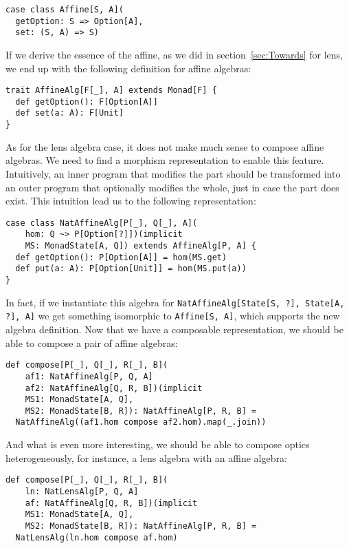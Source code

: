 \documentclass[final, twocolumn, 3p]{elsarticle}
\begin{document}
\begin{lstlisting}
case class Affine[S, A](
  getOption: S => Option[A],
  set: (S, A) => S)
\end{lstlisting}

If we derive the essence of the affine, as we did in section~\ref{sec:Towards}
for lens, we end up with the following definition for affine algebras:

\begin{lstlisting}
trait AffineAlg[F[_], A] extends Monad[F] {
  def getOption(): F[Option[A]]
  def set(a: A): F[Unit]
}
\end{lstlisting}

As for the lens algebra case, it does not make much sense to compose affine
algebras. We need to find a morphism representation to enable this feature.
Intuitively, an inner program that modifies the part should be transformed into
an outer program that optionally modifies the whole, just in case the part does
exist. This intuition lead us to the following representation:

\begin{lstlisting}
case class NatAffineAlg[P[_], Q[_], A](
    hom: Q ~> P[Option[?]])(implicit
    MS: MonadState[A, Q]) extends AffineAlg[P, A] {
  def getOption(): P[Option[A]] = hom(MS.get)
  def put(a: A): P[Option[Unit]] = hom(MS.put(a))
}
\end{lstlisting}

In fact, if we instantiate this algebra for
\lstinline{NatAffineAlg[State[S, ?], State[A, ?], A]} we get something
isomorphic to \lstinline{Affine[S, A]}, which supports the new algebra
definition. Now that we have a composable representation, we should be able to
compose a pair of affine algebras:

\begin{lstlisting}
def compose[P[_], Q[_], R[_], B](
    af1: NatAffineAlg[P, Q, A]
    af2: NatAffineAlg[Q, R, B])(implicit
    MS1: MonadState[A, Q],
    MS2: MonadState[B, R]): NatAffineAlg[P, R, B] =
  NatAffineAlg((af1.hom compose af2.hom).map(_.join))
\end{lstlisting}

And what is even more interesting, we should be able to compose optics
heterogeneously, for instance, a lens algebra with an affine algebra:

\begin{lstlisting}
def compose[P[_], Q[_], R[_], B](
    ln: NatLensAlg[P, Q, A]
    af: NatAffineAlg[Q, R, B])(implicit
    MS1: MonadState[A, Q],
    MS2: MonadState[B, R]): NatAffineAlg[P, R, B] =
  NatLensAlg(ln.hom compose af.hom)
\end{lstlisting}
\end{document}
